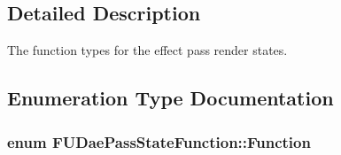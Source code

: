 \subsection{Detailed Description}
The function types for the effect pass render states. 

\subsection{Enumeration Type Documentation}
\hypertarget{namespaceFUDaePassStateFunction_af0f6fbb32c14e5a19559a6630f783313}{
\subsubsection[{Function}]{\setlength{\rightskip}{0pt plus 5cm}enum {\bf FUDaePassStateFunction::Function}}}
\label{namespaceFUDaePassStateFunction_af0f6fbb32c14e5a19559a6630f783313}
